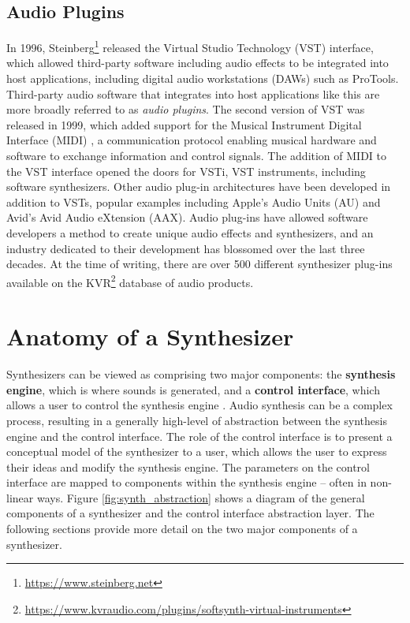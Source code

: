 \subsection{Audio Plugins}
In 1996, Steinberg\footnote{\url{https://www.steinberg.net}} released the Virtual Studio Technology (VST) interface, which allowed third-party software including audio effects to be integrated into host applications, including digital audio workstations (DAWs) such as ProTools. Third-party audio software that integrates into host applications like this are more broadly referred to as \textit{audio plugins}. The second version of VST was released in 1999, which added support for the Musical Instrument Digital Interface (MIDI) \cite{rothstein1992midi}, a communication protocol enabling musical hardware and software to exchange information and control signals. The addition of MIDI to the VST interface opened the doors for VSTi, VST instruments, including software synthesizers. Other audio plug-in architectures have been developed in addition to VSTs, popular examples including Apple's Audio Units (AU) and Avid's Avid Audio eXtension (AAX). Audio plug-ins have allowed software developers a method to create unique audio effects and synthesizers, and an industry dedicated to their development has blossomed over the last three decades. At the time of writing, there are over 500 different synthesizer plug-ins available on the KVR\footnote{\url{https://www.kvraudio.com/plugins/softsynth-virtual-instruments}} database of audio products.

\section{Anatomy of a Synthesizer}
\label{section:synth-anatomy}

Synthesizers can be viewed as comprising two major components: the \textbf{synthesis engine}, which is where sounds is generated, and a \textbf{control interface}, which allows a user to control the synthesis engine \cite{russ2012sound}. Audio synthesis can be a complex process, resulting in a generally high-level of abstraction between the synthesis engine and the control interface. The role of the control interface is to present a conceptual model of the synthesizer to a user, which allows the user to express their ideas and modify the synthesis engine. The parameters on the control interface are mapped to components within the synthesis engine -- often in non-linear ways. Figure \ref{fig:synth_abstraction} shows a diagram of the general components of a synthesizer and the control interface abstraction layer. The following sections provide more detail on the two major components of a synthesizer.

